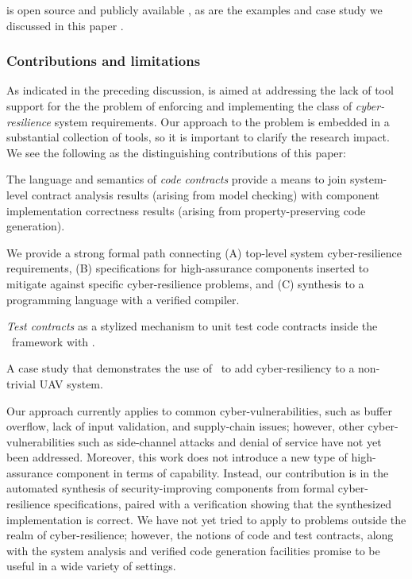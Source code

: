 {\brfcs} is open source and publicly available \cite{fmide}, as are the
examples and case study we discussed in this paper \cite{repo,
phase2, camkes, case}.

\subsubsection*{Contributions and limitations}

As indicated in the preceding discussion, {\brfcs} is aimed at
addressing the lack of tool support for the the problem of enforcing
and implementing the class of \emph{cyber-resilience} system
requirements.  Our approach to the problem is embedded in a
substantial collection of tools, so it is important to clarify the
research impact. We see the following as the distinguishing
contributions of this paper:

\begin{compactitem}
  \item The language and semantics of \emph{code contracts} provide a
  means to join system-level contract analysis results (arising from
  model checking) with component implementation correctness results
  (arising from property-preserving code generation).

\item We provide a strong formal path connecting (A) top-level system cyber-resilience
  requirements, (B) specifications for high-assurance components
  inserted to mitigate against specific cyber-resilience problems, and
  (C) synthesis to a programming language with a verified compiler.

\item \emph{Test contracts} as a
  stylized mechanism to unit test code contracts inside the \brfcs\
  framework with \agr.

\item A case study that demonstrates the use of \brfcs\ to add cyber-resiliency
 to a non-trivial UAV system.
\end{compactitem}

Our approach currently applies to common cyber-vulnerabilities, such
as buffer overflow, lack of input validation, and supply-chain issues;
however, other cyber-vulnerabilities such as side-channel attacks and
denial of service have not yet been addressed. Moreover, this work
does not introduce a new type of high-assurance component in terms of
capability. Instead, our contribution is in the automated synthesis of
security-improving components from formal cyber-resilience
specifications, paired with a verification showing that the
synthesized implementation is correct. We have not yet tried to apply
{\brfcs} to problems outside the realm of cyber-resilience; however,
the notions of code and test contracts, along with the system analysis
and verified code generation facilities promise to be useful in a wide
variety of settings.

